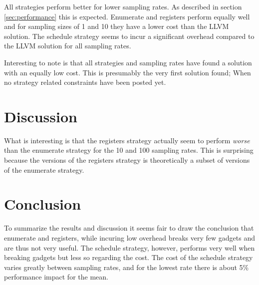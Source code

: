 All strategies perform better for lower sampling rates. As described in section
\ref{sec:performance} this is expected. Enumerate and registers perform equally well and
for sampling sizes of 1 and 10 they have a lower cost than the LLVM solution. The schedule
strategy seems to incur a significant overhead compared to the LLVM solution for all
sampling rates.

Interesting to note is that all strategies and sampling rates have found a solution with
an equally low cost. This is presumably the very first solution found; When no strategy
related constraints have been posted yet.


\section{Discussion}

What is interesting is that the registers strategy actually seem to perform \textit{worse}
than the enumerate strategy for the 10 and 100 sampling rates. This is surprising
because the versions of the registers strategy is theoretically a subset of versions of
the enumerate strategy.


\section{Conclusion}

To summarize the results and discussion it seems fair to draw the conclusion that enumerate
and registers, while incuring low overhead breaks very few gadgets and are thus not very
useful. The schedule strategy, however, performs very well when breaking gadgets but less
so regarding the cost. The cost of the schedule strategy varies greatly between sampling
rates, and for the lowest rate there is about 5\% performance impact for the mean.
